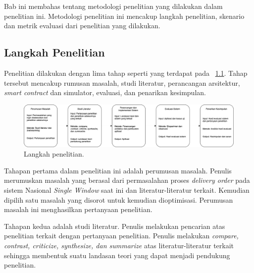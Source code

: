\chapter{\babTiga}
\label{bab:3}

Bab ini membahas tentang metodologi penelitian yang dilakukan dalam penelitian ini. Metodologi penelitian ini mencakup langkah penelitian, skenario dan metrik evaluasi dari penelitian yang dilakukan.


\section{Langkah Penelitian}
\label{sec:langkahPenelitian}

Penelitian dilakukan dengan lima tahap seperti yang terdapat pada 
\pic~\ref{fig:metode}. Tahap tersebut mencakup rumusan masalah, studi literatur, perancangan arsitektur, \textit{smart contract} dan simulator, evaluasi, dan penarikan kesimpulan.

\begin{figure}
	\centering
	\includegraphics[width=\textwidth]{assets/pics/metode}
	\caption{Langkah penelitian.}
	\label{fig:metode}
\end{figure}

Tahapan pertama dalam penelitian ini adalah perumusan masalah. Penulis merumuskan masalah yang berasal dari permasalahan proses \textit{delivery order} pada sistem Nasional \textit{Single Window} saat ini dan literatur-literatur terkait. Kemudian dipilih satu masalah yang disorot untuk kemudian dioptimisasi. Perumusan masalah ini menghasilkan pertanyaan penelitian.

Tahapan kedua adalah studi literatur. Penulis melakukan pencarian atas penelitian terkait dengan pertanyaan penelitian. Penulis melakukan \textit{compare, contrast, criticize, synthesize, dan summarize} atas literatur-literatur terkait sehingga membentuk suatu landasan teori yang dapat menjadi pendukung penelitian. 

